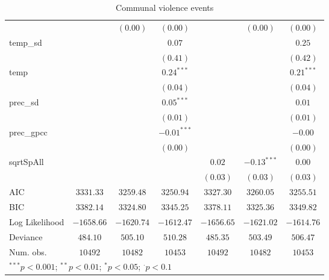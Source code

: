 \begin{sidewaystable}
\begin{center}
{\begin{tabular}{l c c c c c c}
                &                 & $(0.00)$       & $(0.00)$      &               & $(0.00)$      & $(0.00)$      \\
temp\_sd        &                 &                & $0.07$        &               &               & $0.25$        \\
                &                 &                & $(0.41)$      &               &               & $(0.42)$      \\
temp            &                 &                & $0.24^{***}$  &               &               & $0.21^{***}$  \\
                &                 &                & $(0.04)$      &               &               & $(0.04)$      \\
prec\_sd        &                 &                & $0.05^{***}$  &               &               & $0.01$        \\
                &                 &                & $(0.01)$      &               &               & $(0.01)$      \\
prec\_gpcc      &                 &                & $-0.01^{***}$ &               &               & $-0.00$       \\
                &                 &                & $(0.00)$      &               &               & $(0.00)$      \\
sqrtSpAll       &                 &                &               & $0.02$        & $-0.13^{***}$ & $0.00$        \\
                &                 &                &               & $(0.03)$      & $(0.03)$      & $(0.03)$      \\
\hline
AIC             & $3331.33$       & $3259.48$      & $3250.94$     & $3327.30$     & $3260.05$     & $3255.51$     \\
BIC             & $3382.14$       & $3324.80$      & $3345.25$     & $3378.11$     & $3325.36$     & $3349.82$     \\
Log Likelihood  & $-1658.66$      & $-1620.74$     & $-1612.47$    & $-1656.65$    & $-1621.02$    & $-1614.76$    \\
Deviance        & $484.10$        & $505.10$       & $510.28$      & $485.35$      & $503.49$      & $506.47$      \\
Num. obs.       & $10492$         & $10482$        & $10453$       & $10492$       & $10482$       & $10453$       \\
\hline
\multicolumn{7}{l}{\scriptsize{$^{***}p<0.001$; $^{**}p<0.01$; $^{*}p<0.05$; $^{\cdot}p<0.1$}}
\end{tabular}
}
\caption{Communal violence events}
\label{org3}
\end{center}
\end{sidewaystable}
